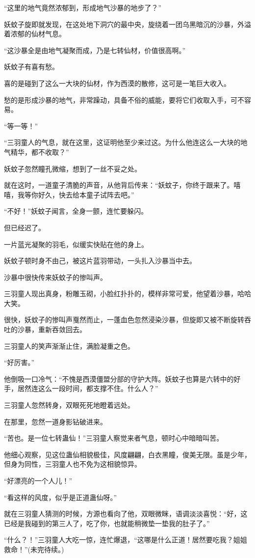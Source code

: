 \begin{this_body}
“这里的地气竟然浓郁到，形成地气沙暴的地步了？”

妖蚊子旋即就发现，在这处地下洞穴的最中央，旋绕着一团乌黑暗沉的沙暴，外溢着浓郁的仙材气息。

“这沙暴全是由地气凝聚而成，乃是七转仙材，价值很高啊。”

妖蚊子有喜有愁。

喜的是碰到了这么一大块的仙材，作为西漠的散修，这可是一笔巨大收入。

愁的是形成沙暴的地气，非常躁动，具备不俗的威能，要将它们收取入手，可不容易。

“等一等！”

“三羽童人的气息，就在这里，这证明他至少来过这。为什么他连这么一大块的地气精华，都不收取？”

妖蚊子忽然瞳孔微缩，想到了一丝不妥之处。

就在这时，一道童子清脆的声音，从他背后传来：“妖蚊子，你终于跟来了。嘻嘻，我等你好久，快去给本童子试阵去吧。”

“不好！”妖蚊子闻言，全身一颤，连忙要躲闪。

但已经迟了。

一片蓝光凝聚的羽毛，似缓实快贴在他的身上。

妖蚊子顿时身不由己，被这片蓝羽带动，一头扎入沙暴当中去。

沙暴中很快传来妖蚊子的惨叫声。

三羽童人现出真身，粉雕玉砌，小脸红扑扑的，模样非常可爱，他望着沙暴，哈哈大笑。

很快，妖蚊子的惨叫声戛然而止，一蓬血色忽然浸染沙暴，但旋即又被不断旋转吞吐的沙暴，重新吞敛回去。

三羽童人的笑声渐渐止住，满脸凝重之色。

“好厉害。”

他倒吸一口冷气：“不愧是西漠僵盟分部的守护大阵。妖蚊子也算是六转中的好手，居然连这么一段时间，都支撑不住。什么人？”

三羽童人忽然转身，双眼死死地瞪着远处。

在那里，忽然一道身影钻破进来。

“苦也。是一位七转蛊仙！”三羽童人察觉来者气息，顿时心中暗暗叫苦。

他细心观察，见这位蛊仙相貌极佳，风度翩翩，白衣黑瞳，俊美无限。虽是少年，但身为同性，三羽童人也不免为这相貌惊异。

“好漂亮的一个人儿！”

“看这样的风度，似乎是正道蛊仙呀。”

就在三羽童人猜测的时候，方源也看向了他，双眼微眯，语调淡淡喜悦：“好，这已经是我碰到的第三人了，吃了你，也就能稍微垫一垫我的肚子了。”

“什么？！”三羽童人大吃一惊，连忙爆退，“这哪是什么正道！居然要吃我？姐姐救命！”(未完待续。)

\end{this_body}


